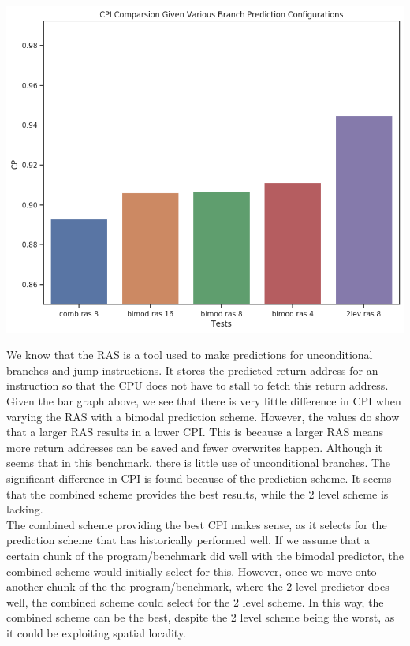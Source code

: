 \documentclass[twocolumn]{article}
\begin{document}
\begingroup
    \centering
    \medskip
    \includegraphics[width=0.68\columnwidth]{Lab-Tex/Lab9-images/cpi.png}
    \label{fig:}
    \medskip
\endgroup

We know that the RAS is a tool used to make predictions for unconditional branches and jump instructions. It stores the predicted return address for an instruction so that the CPU does not have to stall to fetch this return address. \\

Given the bar graph above, we see that there is very little difference in CPI when varying the RAS with a bimodal prediction scheme. However, the values do show that a larger RAS results in a lower CPI. This is because a larger RAS means more return addresses can be saved and fewer overwrites happen. Although it seems that in this benchmark, there is little use of unconditional branches. The significant difference in CPI is found because of the prediction scheme. It seems that the combined scheme provides the best results, while the 2 level scheme is lacking.\\

The combined scheme providing the best CPI makes sense, as it selects for the prediction scheme that has historically performed well. If we assume that a certain chunk of the program/benchmark did well with the bimodal predictor, the combined scheme would initially select for this. However, once we move onto another chunk of the the program/benchmark, where the 2 level predictor does well, the combined scheme could select for the 2 level scheme. In this way, the combined scheme can be the best, despite the 2 level scheme being the worst, as it could be exploiting spatial locality.\\
\end{document}
